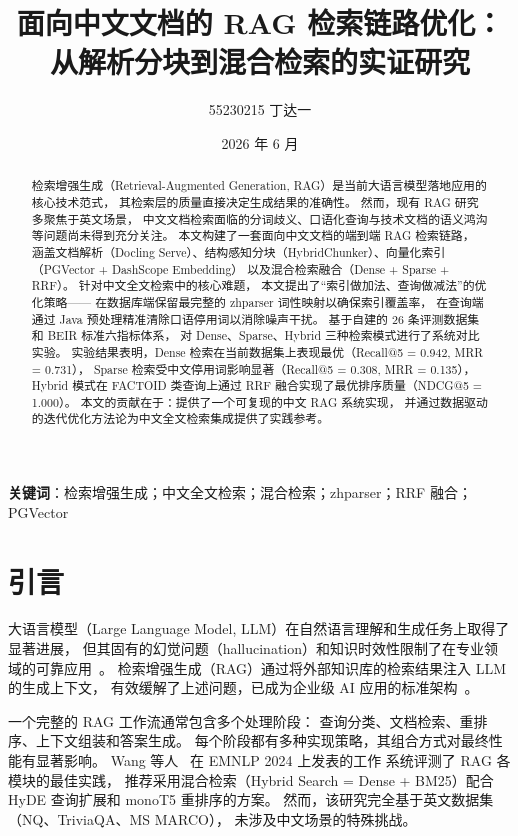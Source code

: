 \documentclass[a4paper, 12pt]{ctexart}
\title{\heiti\Large 面向中文文档的 RAG 检索链路优化：\\从解析分块到混合检索的实证研究}
\author{55230215 丁达一}
\date{2026 年 6 月}
\begin{document}
\maketitle

\begin{abstract}
检索增强生成（Retrieval-Augmented Generation, RAG）是当前大语言模型落地应用的核心技术范式，
其检索层的质量直接决定生成结果的准确性。
然而，现有 RAG 研究多聚焦于英文场景，
中文文档检索面临的分词歧义、口语化查询与技术文档的语义鸿沟等问题尚未得到充分关注。
本文构建了一套面向中文文档的端到端 RAG 检索链路，
涵盖文档解析（Docling Serve）、结构感知分块（HybridChunker）、向量化索引（PGVector + DashScope Embedding）
以及混合检索融合（Dense + Sparse + RRF）。
针对中文全文检索中的核心难题，
本文提出了``索引做加法、查询做减法''的优化策略——
在数据库端保留最完整的 zhparser 词性映射以确保索引覆盖率，
在查询端通过 Java 预处理精准清除口语停用词以消除噪声干扰。
基于自建的 26 条评测数据集和 BEIR 标准六指标体系，
对 Dense、Sparse、Hybrid 三种检索模式进行了系统对比实验。
实验结果表明，Dense 检索在当前数据集上表现最优（Recall@5 = 0.942, MRR = 0.731），
Sparse 检索受中文停用词影响显著（Recall@5 = 0.308, MRR = 0.135），
Hybrid 模式在 FACTOID 类查询上通过 RRF 融合实现了最优排序质量（NDCG@5 = 1.000）。
本文的贡献在于：提供了一个可复现的中文 RAG 系统实现，
并通过数据驱动的迭代优化方法论为中文全文检索集成提供了实践参考。
\end{abstract}

\noindent\textbf{关键词}：检索增强生成；中文全文检索；混合检索；zhparser；RRF 融合；PGVector

\newpage
\tableofcontents
\newpage

\section{引言}

大语言模型（Large Language Model, LLM）在自然语言理解和生成任务上取得了显著进展，
但其固有的幻觉问题（hallucination）和知识时效性限制了在专业领域的可靠应用~\cite{gao2023rag}。
检索增强生成（RAG）通过将外部知识库的检索结果注入 LLM 的生成上下文，
有效缓解了上述问题，已成为企业级 AI 应用的标准架构~\cite{wang2024rag_bpractices}。

一个完整的 RAG 工作流通常包含多个处理阶段：
查询分类、文档检索、重排序、上下文组装和答案生成。
每个阶段都有多种实现策略，其组合方式对最终性能有显著影响。
Wang 等人~\cite{wang2024rag_bpractices} 在 EMNLP 2024 上发表的工作
系统评测了 RAG 各模块的最佳实践，
推荐采用混合检索（Hybrid Search = Dense + BM25）配合 HyDE 查询扩展和 monoT5 重排序的方案。
然而，该研究完全基于英文数据集（NQ、TriviaQA、MS MARCO），
未涉及中文场景的特殊挑战。
\end{document}
